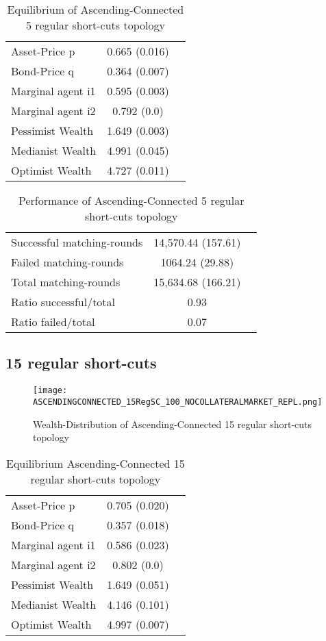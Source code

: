 \documentclass[Bachelorarbeit.tex]{subfiles}
\begin{document}
\begin{table}[H]
	\caption{Equilibrium of Ascending-Connected 5 regular short-cuts topology}
	\centering
	\begin{tabular} { l c r }
		\hline
		Asset-Price p & 0.665 (0.016) \\
		Bond-Price q & 0.364 (0.007) \\
		Marginal agent i1 & 0.595 (0.003) \\
		Marginal agent i2 & 0.792 (0.0) \\
		\hline
		Pessimist Wealth & 1.649 (0.003) \\
		Medianist Wealth & 4.991 (0.045) \\
		Optimist Wealth & 4.727 (0.011) \\
		\hline
	\end{tabular}
\end{table} 

\begin{table}[H]
	\caption{Performance of Ascending-Connected 5 regular short-cuts topology}
	\centering
	\begin{tabular} { l c r }
		\hline
		Successful matching-rounds& 14,570.44 (157.61) \\
		Failed matching-rounds & 1064.24 (29.88) \\
		Total matching-rounds & 15,634.68 (166.21) \\
		\hline
		Ratio successful/total & 0.93 \\
		Ratio failed/total & 0.07 \\
		\hline
	\end{tabular}
\end{table}

\subsection{15 regular short-cuts}
\begin{figure}[H]
	\centering
  \texttt{[image: ASCENDINGCONNECTED\_15RegSC\_100\_NOCOLLATERALMARKET\_REPL.png]}
	\caption{Wealth-Distribution of Ascending-Connected 15 regular short-cuts topology}
	\label{fig:wealth_ASCENDINGCONNECTED_15RegSC_100_NOCOLLATERALMARKET_REPL}
\end{figure}

\begin{table}[H]
	\caption{Equilibrium Ascending-Connected 15 regular short-cuts topology}
	\centering
	\begin{tabular} { l c r }
		\hline
		Asset-Price p & 0.705 (0.020) \\
		Bond-Price q & 0.357 (0.018) \\
		Marginal agent i1 & 0.586 (0.023) \\
		Marginal agent i2 & 0.802 (0.0) \\
		\hline
		Pessimist Wealth & 1.649 (0.051) \\
		Medianist Wealth & 4.146 (0.101) \\
		Optimist Wealth & 4.997 (0.007) \\
		\hline
	\end{tabular}
\end{table} 
\end{document}
